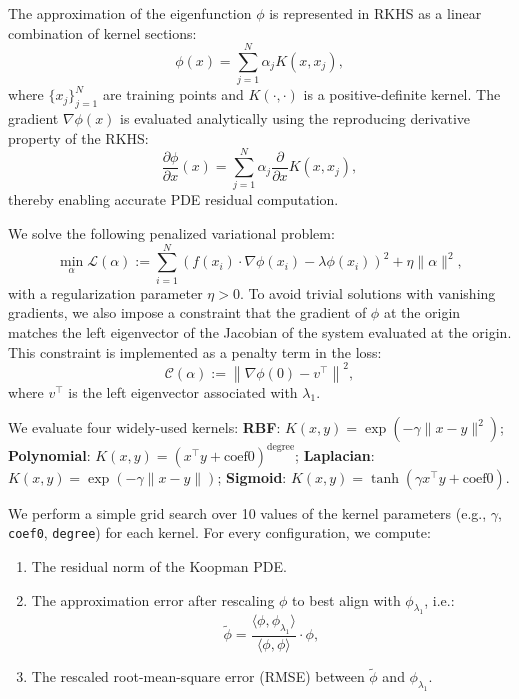 \documentclass[11pt]{article}
\theoremstyle{plain}
\def\[{\begin{equation}}
\def\]{\end{equation}}
\begin{document}
The approximation of the eigenfunction \( \phi \) is represented in RKHS as a linear combination of kernel sections:
\[
\phi(x) = \sum_{j=1}^N \alpha_j K(x, x_j),
\]
where \( \{x_j\}_{j=1}^N \) are training points and \( K(\cdot, \cdot) \) is a positive-definite kernel. The gradient \( \nabla \phi(x) \) is evaluated analytically using the {reproducing derivative property} of the RKHS:
\[
\frac{\partial \phi}{\partial x}(x) = \sum_{j=1}^N \alpha_j \frac{\partial}{\partial x} K(x, x_j),
\]
thereby enabling accurate PDE residual computation.

We solve the following penalized variational problem:
\[
\min_\alpha \mathcal{L}(\alpha) := \sum_{i=1}^N \left(f(x_i) \cdot \nabla \phi(x_i) - \lambda \phi(x_i)\right)^2 + \eta \|\alpha\|^2,
\]
with a regularization parameter \( \eta > 0 \). To avoid trivial solutions with vanishing gradients, we also impose a constraint that the gradient of \( \phi \) at the origin matches the {left eigenvector of the Jacobian} of the system evaluated at the origin. This constraint is implemented as a penalty term in the loss:
\[
\mathcal{C}(\alpha) := \left\| \nabla \phi(0) - v^\top \right\|^2,
\]
where \( v^\top \) is the left eigenvector associated with \( \lambda_1 \).

We evaluate four widely-used kernels: \textbf{RBF}: \( K(x,y) = \exp(-\gamma \|x - y\|^2) \); \textbf{Polynomial}: \( K(x,y) = (x^\top y + \text{coef0})^{\text{degree}} \); \textbf{Laplacian}: \( K(x,y) = \exp(-\gamma \|x - y\|) \); \textbf{Sigmoid}: \( K(x,y) = \tanh(\gamma x^\top y + \text{coef0}) \).


We perform a simple grid search over 10 values of the kernel parameters (e.g., \( \gamma \), \texttt{coef0}, \texttt{degree}) for each kernel. For every configuration, we compute:
\begin{enumerate}
    \item The residual norm of the Koopman PDE.
    \item The approximation error after rescaling \( \phi \) to best align with \( \phi_{\lambda_1} \), i.e.:
    \[
    \tilde{\phi} = \frac{\langle \phi, \phi_{\lambda_1} \rangle}{\langle \phi, \phi \rangle} \cdot \phi,
    \]
    \item The rescaled root-mean-square error (RMSE) between \( \tilde{\phi} \) and \( \phi_{\lambda_1} \).
\end{enumerate}
\end{document}
